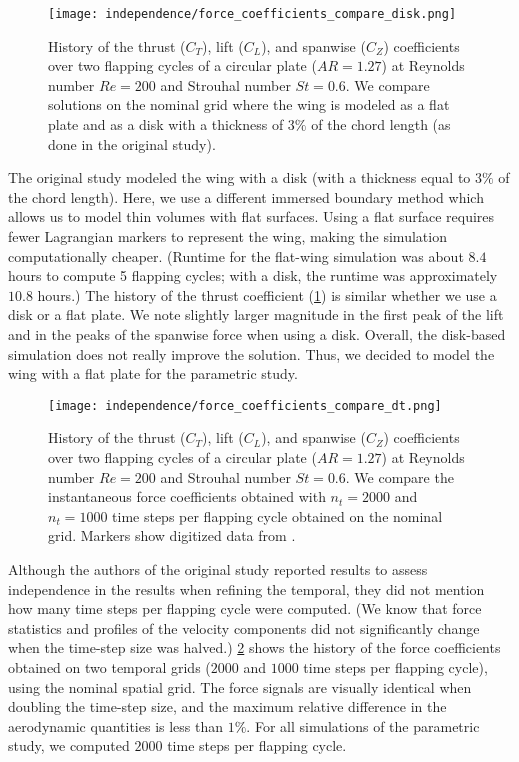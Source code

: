 \begin{figure}[!h]
  \centering
  \texttt{[image: independence/force\_coefficients\_compare\_disk.png]}
  \caption{History of the thrust ($C_T$), lift ($C_L$), and spanwise ($C_Z$) coefficients over two flapping cycles of a circular plate ($AR = 1.27$) at Reynolds number $Re = 200$ and Strouhal number $St = 0.6$. We compare solutions on the nominal grid where the wing is modeled as a flat plate and as a disk with a thickness of $3\%$ of the chord length (as done in the original study\supercite{li_dong_2016}).}
  \label{fig:independence_force_coefficients_disk}
\end{figure}

The original study modeled the wing with a disk (with a thickness equal to $3\%$ of the chord length).
Here, we use a different immersed boundary method which allows us to model thin volumes with flat surfaces.
Using a flat surface requires fewer Lagrangian markers to represent the wing, making the simulation computationally cheaper.
(Runtime for the flat-wing simulation was about $8.4$ hours to compute 5 flapping cycles; with a disk, the runtime was approximately $10.8$ hours.)
The history of the thrust coefficient (\cref{fig:independence_force_coefficients_disk}) is similar whether we use a disk or a flat plate.
We note slightly larger magnitude in the first peak of the lift and in the peaks of the spanwise force when using a disk.
Overall, the disk-based simulation does not really improve the solution.
Thus, we decided to model the wing with a flat plate for the parametric study.

\begin{figure}[!h]
  \centering
  \texttt{[image: independence/force\_coefficients\_compare\_dt.png]}
  \caption{History of the thrust ($C_T$), lift ($C_L$), and spanwise ($C_Z$) coefficients over two flapping cycles of a circular plate ($AR = 1.27$) at Reynolds number $Re = 200$ and Strouhal number $St = 0.6$. We compare the instantaneous force coefficients obtained with $n_t = 2000$ and $n_t = 1000$ time steps per flapping cycle obtained on the nominal grid. Markers show digitized data from \citet{li_dong_2016}.}
  \label{fig:independence_force_coefficients_dt}
\end{figure}

Although the authors of the original study reported results to assess independence in the results when refining the temporal, they did not mention how many time steps per flapping cycle were computed.
(We know that force statistics and profiles of the velocity components did not significantly change when the time-step size was halved.)
\cref{fig:independence_force_coefficients_dt} shows the history of the force coefficients obtained on two temporal grids ($2000$ and $1000$ time steps per flapping cycle), using the nominal spatial grid.
The force signals are visually identical when doubling the time-step size, and the maximum relative difference in the aerodynamic quantities is less than $1\%$.
For all simulations of the parametric study, we computed $2000$ time steps per flapping cycle.

